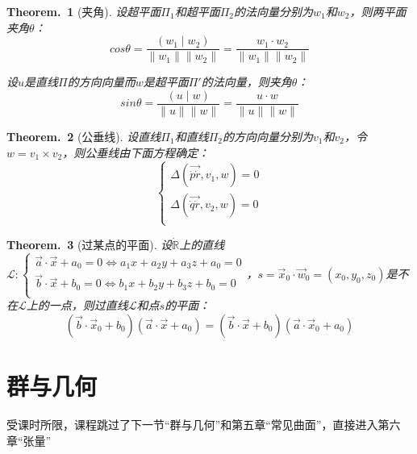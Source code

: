 \documentclass[zihao=5,UTF8]{report}
\def\R{\mathbb{R}}
\theoremstyle{mystyle} %
\newtheorem{theorem}{Theorem.\,}
\begin{document}
\begin{theorem}[夹角]\label{夹角}
设超平面$\Pi_1$和超平面$\Pi_2$的法向量分别为$w_1$和$w_2$，则两平面夹角$\theta$：
\begin{equation*}
    cos \theta = \frac{(w_1\mid w_2)}{\|w_1\|\|w_2\|} = \frac{w_1\cdot w_2}{\|w_1\|\|w_2\|}
\end{equation*}

设$u$是直线$\Pi$的方向向量而$w$是超平面$\Pi'$的法向量，则夹角$\theta$：
\begin{equation*}
    sin \theta = \frac{(u\mid w)}{\|u\|\|w\|} = \frac{u\cdot w}{\|u\|\|w\|}
\end{equation*}

\end{theorem}

\begin{theorem}[公垂线]\label{公垂线}
设直线$\Pi_1$和直线$\Pi_2$的方向向量分别为$v_1$和$v_2$，令$w=v_1\times v_2$，则公垂线由下面方程确定：
\begin{equation*}
    \begin{cases}
        \Delta (\overrightarrow{\dot{p}\dot{r}},v_1,w)=0 \\
        \Delta (\overrightarrow{\dot{q}\dot{r}},v_2,w)=0 \\
    \end{cases}
\end{equation*}
\end{theorem}

\begin{theorem}[过某点的平面]\label{过某点的平面}
设$\dot{\R}$上的直线$\mathscr{L}:\begin{cases}
    \vec{a}\cdot\vec{x}+a_0=0\Longleftrightarrow a_1x+a_2y+a_3z+a_0=0 \\
    \vec{b}\cdot\vec{x}+b_0=0\Longleftrightarrow b_1x+b_2y+b_3z+b_0=0 \\
\end{cases} $，$s=\vec{x}_0\cdot\vec{w}_0 = (x_0,y_0,z_0)$是不在$\mathscr{L}$上的一点，则过直线$\mathscr{L}$和点$s$的平面：
\begin{equation*}
    (\vec{b}\cdot\vec{x}_0+b_0)(\vec{a}\cdot\vec{x}+a_0)=(\vec{b}\cdot\vec{x}+b_0)(\vec{a}\cdot\vec{x}_0+a_0)
\end{equation*}

\end{theorem}


\section{群与几何}
{\par\color{gray}
受课时所限，课程跳过了下一节“群与几何”和第五章“常见曲面”，直接进入第六章“张量”
\par}
\end{document}
